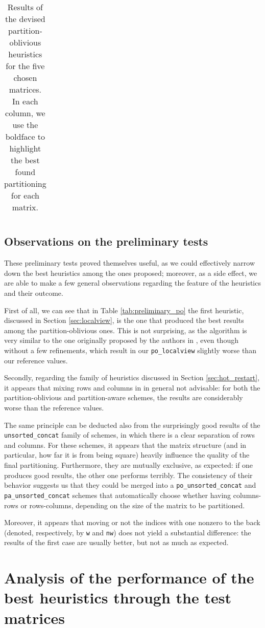 \begin{table}[h]
\begin{tabular}{|l|c||c|c|c|c|c||c|}
	\end{tabular}
	\caption{Results of the devised partition-oblivious heuristics for the five chosen matrices. In each column, we use the boldface to highlight the best found partitioning for each matrix. } \label{tab:preliminary_pa}
\end{table}

\subsection{Observations on the preliminary tests}

These preliminary tests proved themselves useful, as we could effectively narrow down the best heuristics among the ones proposed; moreover, as a side effect, we are able to make a few general observations regarding the feature of the heuristics and their outcome.

First of all, we can see that in Table \ref{tab:preliminary_po} the first heuristic, discussed in Section \ref{sec:localview}, is the one that produced the best results among the partition-oblivious ones. This is not surprising, as the algorithm is very similar to the one originally proposed by the authors in \cite{mediumgrain}, even though without a few refinements, which result in our \verb|po_localview| slightly worse than our reference values.

Secondly, regarding the family of heuristics discussed in Section \ref{sec:hot_restart}, it appears that mixing rows and columns in in general not advisable: for both the partition-oblivious and partition-aware schemes, the results are considerably worse than the reference values. 

The same principle can be deducted also from the surprisingly good results of the \verb|unsorted_concat| family of schemes, in which there is a clear separation of rows and columns. For these schemes, it appears that the matrix structure (and in particular, how far it is from being square) heavily influence the quality of the final partitioning. Furthermore, they are mutually exclusive, as expected: if one produces good results, the other one performs terribly. The consistency of their behavior suggests us that they could be merged into a \verb|po_unsorted_concat| and \verb|pa_unsorted_concat| schemes that automatically choose whether having columns-rows or rows-columns, depending on the size of the matrix to be partitioned.

Moreover, it appears that moving or not the indices with one nonzero to the back (denoted, respectively, by \verb|w| and \verb|nw|) does not yield a substantial difference: the results of the first case are usually better, but not as much as expected.

\section{Analysis of the performance of the best heuristics through the test matrices}



